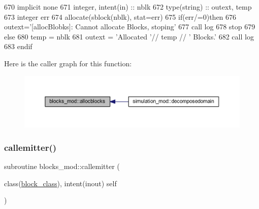 \begin{DoxyCode}
670     \textcolor{keywordtype}{implicit none}
671     \textcolor{keywordtype}{integer}, \textcolor{keywordtype}{intent(in)} ::  nblk
672     \textcolor{keywordtype}{type}(string) :: outext, temp
673     \textcolor{keywordtype}{integer} err
674     \textcolor{keyword}{allocate}(sblock(nblk), stat=err)
675     \textcolor{keywordflow}{if}(err/=0)\textcolor{keywordflow}{then}
676         outext=\textcolor{stringliteral}{'[allocBlobks]: Cannot allocate Blocks, stoping'}
677         \textcolor{keyword}{call }log%
678         stop
679     \textcolor{keywordflow}{else}
680         temp = nblk
681         outext = \textcolor{stringliteral}{'Allocated '}// temp // \textcolor{stringliteral}{' Blocks.'}
682         \textcolor{keyword}{call }log%
683 \textcolor{keywordflow}{    endif}
\end{DoxyCode}
Here is the caller graph for this function\+:\nopagebreak
\begin{figure}[H]
\begin{center}
\leavevmode
\includegraphics[width=350pt]{namespaceblocks__mod_a639beb0fee2290d46353f4b4702d6711_icgraph}
\end{center}
\end{figure}
\mbox{\label{namespaceblocks__mod_a2c3cf5113e1422d812c2c869afde2729}} 
\subsubsection{\texorpdfstring{callemitter()}{callemitter()}}
{\footnotesize\ttfamily subroutine blocks\+\_\+mod\+::callemitter (\begin{DoxyParamCaption}\item[{class(\mbox{\hyperlink{structblocks__mod_1_1block__class}{block\+\_\+class}}), intent(inout)}]{self }\end{DoxyParamCaption})\hspace{0.3cm}{\ttfamily [private]}}



